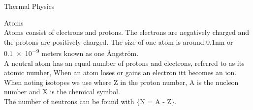 \documentclass{article}
\begin{document}
\Huge \raggedright Thermal Physics \\ \vspace{1cm}
\begin{large}
    \LARGE Atoms \\
    \large Atoms consist of electrons and protons. The electrons are negatively charged and the protons are positively charged. The size of one atom is around 0.1nm or \num{0.1e-9} meters known as one Ångström. \\
    \large A neutral atom has an equal number of protons and electrons, referred to as its atomic number, When an atom loses or gains an electron itt becomes an ion. When noting isotopes we use  where Z in the proton number, A is the nucleon number and X is the chemical symbol. \\ 
    \large The number of neutrons can be found with \{N = A - Z\}. 

\end{large}
\end{document}
